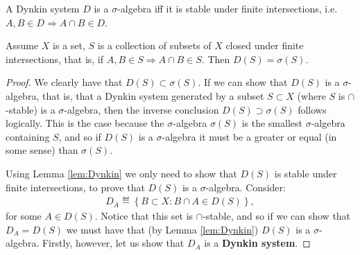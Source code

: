 \begin{lemma}   \label{lem:Dynkin}
    A Dynkin system \(D\) is a \(\sigma\)-algebra iff it is stable under finite intersections, i.e. \(A,B \in D \Rightarrow A \cap B \in D\).
\end{lemma}
\begin{theorem}[Dynkin] \label{theorem:Dynkin}
    Assume \(X\) is a set, \(S\) is a collection of subsets of \(X\) closed under finite intersections, that is, if 
    \(A, B \in S \Rightarrow A \cap B \in S\). Then \(D(S) = \sigma(S)\).
\end{theorem}
\begin{proof}
    We clearly have that \(D(S) \subset \sigma(S)\). If we can show
    that \(D(S)\) is a \(\sigma\)-algebra, that is, that a Dynkin system generated by a subset \(S \subset X\) (where \(S\) is 
    \(\cap\)-stable) is a \(\sigma\)-algebra, then the inverse conclusion \(D(S) \supset \sigma(S)\) follows logically. This is the case
    because the \(\sigma\)-algebra \(\sigma(S)\) is the smallest \(\sigma\)-algebra containing \(S\), and so if \(D(S)\) is a 
    \(\sigma\)-algebra it must be a greater or equal (in some sense) than \(\sigma(S)\). 

    Using Lemma \ref{lem:Dynkin} we only need to show that \(D(S)\) is stable under finite intersections, to prove that \(D(S)\) is a
    \(\sigma\)-algebra. Consider:
    \begin{align*}
        D_{A} \eqdef \left\{B \subset X : B \cap A \in D(S)\right\},
    \end{align*}
    for some \(A\in D(S)\). Notice that this set is \(\cap\)-stable, and so if we can show that \(D_{A} = D(S)\) we must have that 
    (by Lemma \ref{lem:Dynkin}) \(D(S)\) is a \(\sigma\)-algebra. Firstly, however, let us show that \(D_{A}\) is a \textbf{Dynkin system}. 
    

\end{proof}
